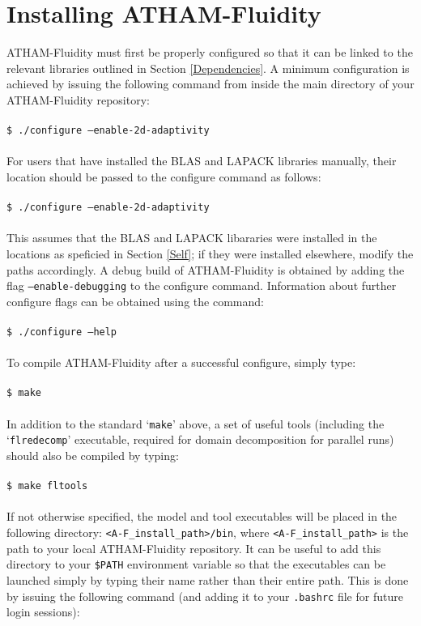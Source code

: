 \documentclass[10pt,a4paper]{article}
\newcommand\tab[1][0.5cm]{\hspace*{#1}}
\begin{document}
\section{Installing ATHAM-Fluidity}
ATHAM-Fluidity must first be properly configured so that it can be linked to the relevant libraries outlined in Section \ref{Dependencies}. A minimum configuration is achieved by issuing the following command from inside the main directory of your ATHAM-Fluidity repository:\\\\
\tab \texttt{\$ ./configure --enable-2d-adaptivity}\\\\
For users that have installed the BLAS and LAPACK libraries manually, their location should be passed to the configure command as follows:\\\\
\tab \texttt{\$ ./configure --enable-2d-adaptivity  }\\\\
This assumes that the BLAS and LAPACK libararies were installed in the locations as speficied in Section \ref{Self}; if they were installed elsewhere, modify the paths accordingly. A debug build of ATHAM-Fluidity is obtained by adding the flag \texttt{--enable-debugging} to the configure command. Information about further configure flags can be obtained using the command:\\\\
\tab \texttt{\$ ./configure --help}\\\\
To compile ATHAM-Fluidity after a successful configure, simply type:\\\\
\tab \texttt{\$ make}\\\\
In addition to the standard `\texttt{make}' above, a set of useful tools (including the `\texttt{flredecomp}' executable, required for domain decomposition for parallel runs) should also be compiled by typing:\\\\
\tab \texttt{\$ make fltools}\\\\
If not otherwise specified, the model and tool executables will be placed in the following directory: \texttt{<A-F\_install\_path>/bin}, where \texttt{<A-F\_install\_path>} is the path to your local ATHAM-Fluidity repository. It can be useful to add this directory to your \texttt{\$PATH} environment variable so that the executables can be launched simply by typing their name rather than their entire path. This is done by issuing the following command (and adding it to your \texttt{.bashrc} file for future login sessions):\\\\
\end{document}
